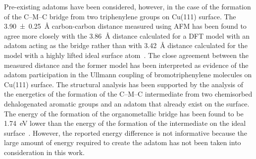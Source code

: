 \documentclass[aps,prb,amsmath,amssymb,11pt]{revtex4-1}
\begin{document}
Pre-existing adatoms have been considered, however, in the case of the formation of the C--M--C bridge from two triphenylene groups on Cu(111) surface. 
The \SI{3.90\pm 0.25}{\angstrom} carbon-carbon distance measured using AFM has been found to agree more closely with the \SI{3.86}{\angstrom} distance calculated for a DFT model with an adatom acting as the bridge rather than with \SI{3.42}{\angstrom} distance calculated for the model with a highly lifted ideal surface atom~\cite{acsnano2017}. 
The close agreement between the measured distance and the former model has been interpreted as evidence of the adatom participation in the Ullmann coupling of bromotriphenylene molecules on Cu(111) surface. 
%
The structural analysis has been supported by the analysis of the energetics of the formation of the C--M--C intermediate from two chemisorbed dehalogenated aromatic groups and an adatom that already exist on the surface. The energy of the formation of the organometallic bridge has been found to be \SI{1.74}{\electronvolt} lower than the energy of the formation of the intermediate on the ideal surface~\cite{acsnano2017}. However, the reported energy difference is not informative because the large amount of energy required to create the adatom has not been taken into consideration in this work.

\end{document}
